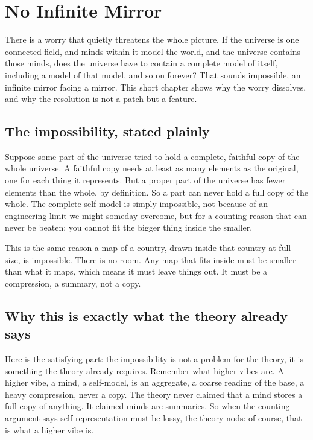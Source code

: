 \section{No Infinite Mirror}

There is a worry that quietly threatens the whole picture. If the universe is one connected field, and minds within it model the world, and the universe contains those minds, does the universe have to contain a complete model of itself, including a model of that model, and so on forever? That sounds impossible, an infinite mirror facing a mirror. This short chapter shows why the worry dissolves, and why the resolution is not a patch but a feature.

\subsection{The impossibility, stated plainly}

Suppose some part of the universe tried to hold a complete, faithful copy of the whole universe. A faithful copy needs at least as many elements as the original, one for each thing it represents. But a proper part of the universe has fewer elements than the whole, by definition. So a part can never hold a full copy of the whole. The complete-self-model is simply impossible, not because of an engineering limit we might someday overcome, but for a counting reason that can never be beaten: you cannot fit the bigger thing inside the smaller.

This is the same reason a map of a country, drawn inside that country at full size, is impossible. There is no room. Any map that fits inside must be smaller than what it maps, which means it must leave things out. It must be a compression, a summary, not a copy.

\subsection{Why this is exactly what the theory already says}

Here is the satisfying part: the impossibility is not a problem for the theory, it is something the theory already requires. Remember what higher vibes are. A higher vibe, a mind, a self-model, is an aggregate, a coarse reading of the base, a heavy compression, never a copy. The theory never claimed that a mind stores a full copy of anything. It claimed minds are summaries. So when the counting argument says self-representation must be lossy, the theory nods: of course, that is what a higher vibe is.

